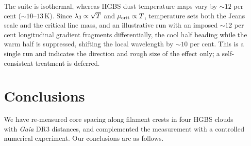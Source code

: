 \documentclass[usenatbib,twoside,twocolumn]{mnras}
\begin{document}
The suite is isothermal, whereas HGBS dust-temperature maps vary by $\sim12$ per cent ($\sim10$--$13$\,K). Since $\lambda_{\rm J}\propto\sqrt{T}$ and $\mu_{\rm crit}\propto T$, temperature sets both the Jeans scale and the critical line mass, and an illustrative run with an imposed $\sim12$ per cent longitudinal gradient fragments differentially, the cool half beading while the warm half is suppressed, shifting the local wavelength by $\sim10$ per cent. This is a single run and indicates the direction and rough size of the effect only; a self-consistent treatment is deferred.



\section{Conclusions}

We have re-measured core spacing along filament crests in four HGBS clouds with \textit{Gaia} DR3 distances, and complemented the measurement with a controlled numerical experiment. Our conclusions are as follows.
\end{document}
